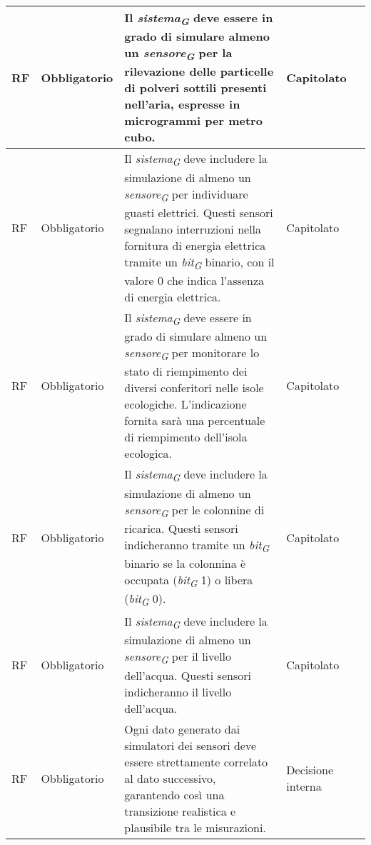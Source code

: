 \begin{longtable}{|C{1.5cm}|C{2cm}|L{5cm}|C{2cm}|C{1.5cm}|}
    \hline
     RF & Obbligatorio &  Il \textit{sistema}\textsubscript{\textit{G}} deve essere in grado di simulare almeno un \textit{sensore}\textsubscript{\textit{G}} per la rilevazione delle particelle di polveri sottili presenti nell'aria, espresse in microgrammi per metro cubo.& Capitolato & \\
    
    \hline
     RF & Obbligatorio &  Il \textit{sistema}\textsubscript{\textit{G}} deve includere la simulazione di almeno un \textit{sensore}\textsubscript{\textit{G}} per individuare guasti elettrici. Questi sensori segnalano interruzioni nella fornitura di energia elettrica tramite un \textit{bit}\textsubscript{\textit{G}} binario, con il valore 0 che indica l'assenza di energia elettrica.& Capitolato & \\
    
    \hline
     RF & Obbligatorio &  Il \textit{sistema}\textsubscript{\textit{G}} deve essere in grado di simulare almeno un \textit{sensore}\textsubscript{\textit{G}} per monitorare lo stato di riempimento dei diversi conferitori nelle isole ecologiche. L'indicazione fornita sarà una percentuale di riempimento dell'isola ecologica. & Capitolato & \\
    
    \hline
     RF & Obbligatorio & Il \textit{sistema}\textsubscript{\textit{G}} deve includere la simulazione di almeno un \textit{sensore}\textsubscript{\textit{G}} per le colonnine di ricarica. Questi sensori indicheranno tramite un \textit{bit}\textsubscript{\textit{G}} binario se la colonnina è occupata (\textit{bit}\textsubscript{\textit{G}} 1) o libera (\textit{bit}\textsubscript{\textit{G}} 0).& Capitolato & \\
    
    \hline
     RF & Obbligatorio & Il \textit{sistema}\textsubscript{\textit{G}} deve includere la simulazione di almeno un \textit{sensore}\textsubscript{\textit{G}} per il livello dell'acqua. Questi sensori indicheranno il livello dell'acqua.& Capitolato &  \\
    
    \hline
     RF & Obbligatorio &  Ogni dato generato dai simulatori dei sensori deve essere strettamente correlato al dato successivo, garantendo così una transizione realistica e plausibile tra le misurazioni.& Decisione interna & \\
    

\end{longtable}
